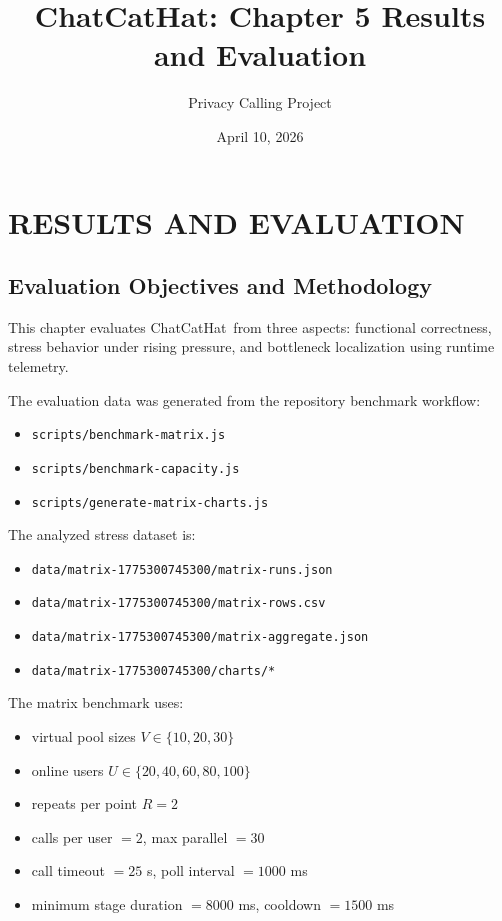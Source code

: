 \documentclass[12pt,a4paper]{report}
\title{ChatCatHat\texttrademark: Chapter 5 Results and Evaluation}
\author{Privacy Calling Project}
\date{April 10, 2026}
\begin{document}
\maketitle
\tableofcontents

\setcounter{chapter}{4}
\chapter{RESULTS AND EVALUATION}
\label{chap:results-evaluation}

\section{Evaluation Objectives and Methodology}
\label{sec:eval-objectives}
This chapter evaluates ChatCatHat\texttrademark\ from three aspects: functional correctness, stress behavior under rising pressure, and bottleneck localization using runtime telemetry.

The evaluation data was generated from the repository benchmark workflow:
\begin{itemize}
  \item \texttt{scripts/benchmark-matrix.js}
  \item \texttt{scripts/benchmark-capacity.js}
  \item \texttt{scripts/generate-matrix-charts.js}
\end{itemize}

The analyzed stress dataset is:
\begin{itemize}
  \item \texttt{data/matrix-1775300745300/matrix-runs.json}
  \item \texttt{data/matrix-1775300745300/matrix-rows.csv}
  \item \texttt{data/matrix-1775300745300/matrix-aggregate.json}
  \item \texttt{data/matrix-1775300745300/charts/*}
\end{itemize}

The matrix benchmark uses:
\begin{itemize}
  \item virtual pool sizes \(V \in \{10,20,30\}\)
  \item online users \(U \in \{20,40,60,80,100\}\)
  \item repeats per point \(R=2\)
  \item calls per user \(=2\), max parallel \(=30\)
  \item call timeout \(=25\) s, poll interval \(=1000\) ms
  \item minimum stage duration \(=8000\) ms, cooldown \(=1500\) ms
\end{itemize}
\end{document}
